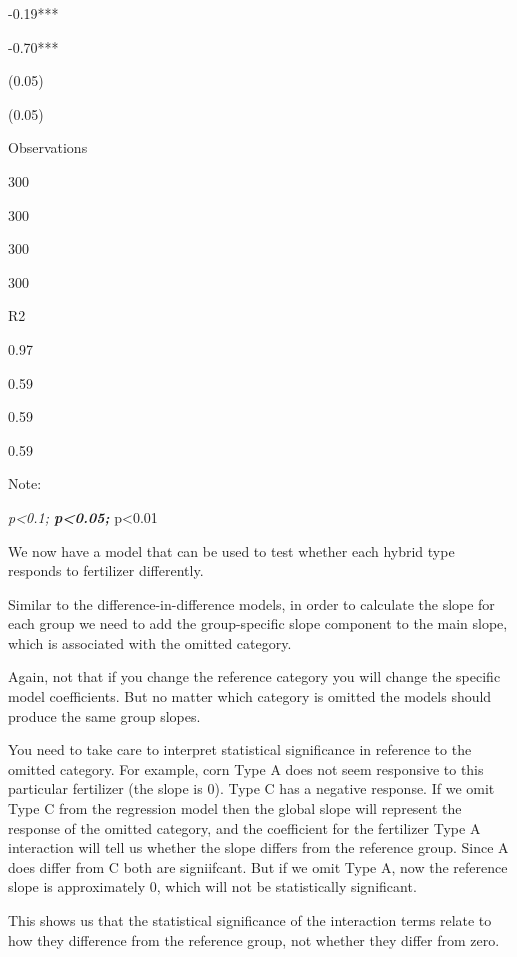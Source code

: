 \documentclass[]{book}
\theoremstyle{definition}
\theoremstyle{definition}
\theoremstyle{definition}
\theoremstyle{remark}
\begin{document}
-0.19***

-0.70***

(0.05)

(0.05)

Observations

300

300

300

300

R2

0.97

0.59

0.59

0.59

Note:

\emph{p\textless{}0.1; \textbf{p\textless{}0.05; }}p\textless{}0.01

We now have a model that can be used to test whether each hybrid type
responds to fertilizer differently.

Similar to the difference-in-difference models, in order to calculate
the slope for each group we need to add the group-specific slope
component to the main slope, which is associated with the omitted
category.

Again, not that if you change the reference category you will change the
specific model coefficients. But no matter which category is omitted the
models should produce the same group slopes.

You need to take care to interpret statistical significance in reference
to the omitted category. For example, corn Type A does not seem
responsive to this particular fertilizer (the slope is 0). Type C has a
negative response. If we omit Type C from the regression model then the
global slope will represent the response of the omitted category, and
the coefficient for the fertilizer Type A interaction will tell us
whether the slope differs from the reference group. Since A does differ
from C both are signiifcant. But if we omit Type A, now the reference
slope is approximately 0, which will not be statistically significant.

This shows us that the statistical significance of the interaction terms
relate to how they difference from the reference group, not whether they
differ from zero.


\end{document}
